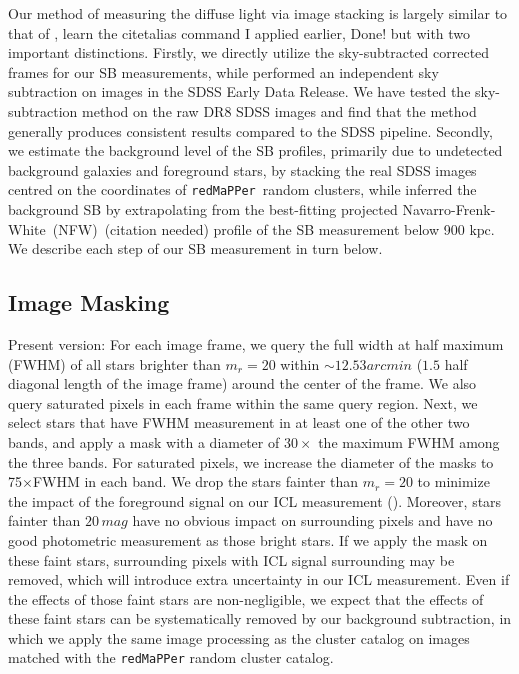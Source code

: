 \documentclass[fleqn,usenatbib]{mnras}
\newcommand{\kpc}{\mathrm{kpc}}
\newcommand\ying[1]{{\color{red} {#1}}}
\newcommand\xkchen[1]{{\color{cyan} {#1}}}
\newcommand*\citeme{{\color{green}(citation needed)}}
\newcommand\redmapper{\texttt{redMaPPer}}
\begin{document}
Our method of measuring the diffuse light via image stacking is largely
similar to that of \citep[hereafter referred to as ]{Zibetti2005},
\ying{learn the citetalias command I applied earlier},\xkchen{Done!} but with two
important distinctions. Firstly, we directly utilize the sky-subtracted
corrected frames for our SB measurements, while  performed an
independent sky subtraction on images in the SDSS Early Data Release. We
have tested the  sky-subtraction method on the raw DR8 SDSS images and
find that the  method generally produces consistent results compared to
the SDSS pipeline.  Secondly, we estimate the background level of the SB
profiles, primarily due to undetected background galaxies and foreground
stars, by stacking the real SDSS images centred on the coordinates of
\redmapper~random clusters, while  inferred the background SB by
extrapolating from the best-fitting projected
Navarro-Frenk-White~(NFW)~\citeme \xkchen{\citep{Navarro1996} } profile of the SB measurement below 900
$\kpc$. We describe each step of our SB measurement in turn below.


\subsection{Image Masking}
\label{subsec:mask}

\xkchen{Present version:}
\xkchen{For each image frame, we query the full width at half maximum (FWHM) of all stars brighter than $m_r{=}20$ within ${\sim}12.53arcmin$ ($1.5$ half diagonal length of the image frame) around the center of the frame. We also query saturated pixels in each frame within the same query region. Next, we select stars that have FWHM measurement in at least one of the other two bands, and apply a mask with a diameter of $30{\times}$ the maximum FWHM among the three bands. For saturated pixels, we increase the diameter of the masks to 75$\times$FWHM in each band. We drop the stars fainter than $m_r{=}20$ to minimize the impact of the foreground signal on our ICL measurement (\citetalias{Zibetti2005}). Moreover, stars fainter than $20\,mag$ have no obvious impact on surrounding pixels and have no good photometric measurement as those bright stars. If we apply the mask on these faint stars, surrounding pixels with ICL signal surrounding may be removed, which will introduce extra uncertainty in our ICL measurement. Even if the effects of those faint stars are non-negligible, we expect that the effects of these faint stars can be systematically removed by our background subtraction, in which we apply the same image processing as the cluster catalog on images matched with the \texttt{redMaPPer} random cluster catalog.}
\end{document}
